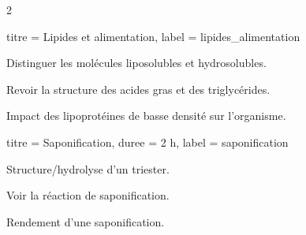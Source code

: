 \begin{multicols}{2}
  \begin{activite}{titre = Lipides et alimentation, label = lipides_alimentation}
    \begin{prerequis}
      \item Distinguer les molécules liposolubles et hydrosolubles.
    \end{prerequis}
    \begin{objectifs}
      \item Revoir la structure des acides gras et des triglycérides.
      \item Impact des lipoprotéines de basse densité sur l'organisme.
    \end{objectifs}
  \end{activite}
  \smallskip
  
  \begin{TP}{titre = Saponification, duree = 2 h, label = saponification}
    \begin{prerequis}
      \item Structure/hydrolyse d'un triester.
    \end{prerequis}
    \begin{objectifs}
      \item Voir la réaction de saponification.
      \item Rendement d'une saponification.
    \end{objectifs}
  \end{TP}  
\end{multicols}

\vspace*{-2cm}



\newpage
\nomPrenomClasse
{}
\vspace*{14pt}


\begin{programmeSeance}
  \seance \seance \seance
\end{programmeSeance}

\begin{programmeSeance}
  \seance \seance \seance
\end{programmeSeance}

\begin{programmeSeance}[nombre = 2, distance = 0 pt]
\end{programmeSeance}


